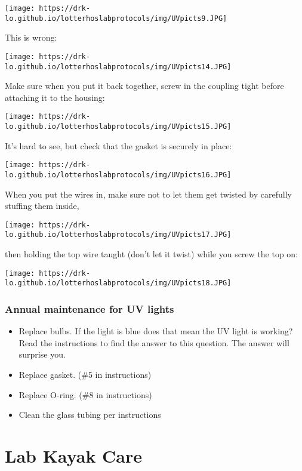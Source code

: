 \documentclass[
  letterpaper,
  DIV=11,
  numbers=noendperiod]{scrreprt}
\begin{document}
\texttt{[image: https://drk-lo.github.io/lotterhoslabprotocols/img/UVpicts9.JPG]}

This is wrong:

\texttt{[image: https://drk-lo.github.io/lotterhoslabprotocols/img/UVpicts14.JPG]}

Make sure when you put it back together, screw in the coupling tight
before attaching it to the housing:

\texttt{[image: https://drk-lo.github.io/lotterhoslabprotocols/img/UVpicts15.JPG]}

It's hard to see, but check that the gasket is securely in place:

\texttt{[image: https://drk-lo.github.io/lotterhoslabprotocols/img/UVpicts16.JPG]}

When you put the wires in, make sure not to let them get twisted by
carefully stuffing them inside,

\texttt{[image: https://drk-lo.github.io/lotterhoslabprotocols/img/UVpicts17.JPG]}

then holding the top wire taught (don't let it twist) while you screw
the top on:

\texttt{[image: https://drk-lo.github.io/lotterhoslabprotocols/img/UVpicts18.JPG]}

\hypertarget{annual-maintenance-for-uv-lights}{%
\subsection*{\texorpdfstring{\textbf{Annual maintenance for UV
lights}}{Annual maintenance for UV lights}}\label{annual-maintenance-for-uv-lights}}

\begin{itemize}
\item
  Replace bulbs. If the light is blue does that mean the UV light is
  working? Read the instructions to find the answer to this question.
  The answer will surprise you.
\item
  Replace gasket. (\#5 in instructions)
\item
  Replace O-ring. (\#8 in instructions)
\item
  Clean the glass tubing per instructions
\end{itemize}

\hypertarget{lab-kayak-care}{%
\chapter{Lab Kayak Care}\label{lab-kayak-care}}
\end{document}
